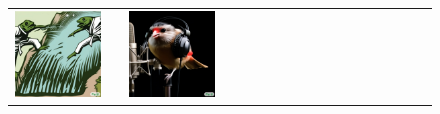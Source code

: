 \begin{figure}[ht!]
\begin{adjustwidth}{-0.8in}{-0.5in}
\begin{tabular}{cccccccccccccccccccc}
\multicolumn{2}{c}{\includegraphics[width=\threebythreecolwidth\textwidth]{figures/cherries/chameleon_2.jpg}} &&
\multicolumn{2}{c}{\includegraphics[width=\threebythreecolwidth\textwidth]{figures/cherries/bird_sing1.jpg}} &

\end{tabular}
\end{adjustwidth}
\end{figure}
